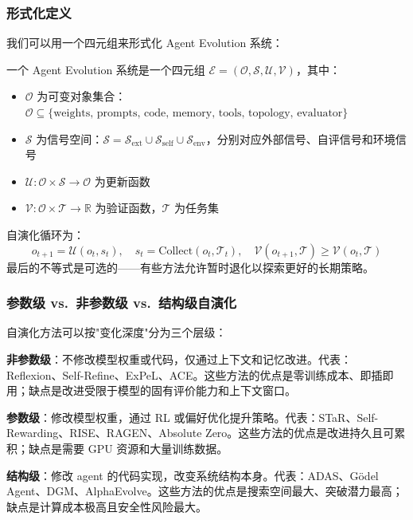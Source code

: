 \subsubsection{形式化定义}

我们可以用一个四元组来形式化 Agent Evolution 系统：

\begin{definition}
一个 Agent Evolution 系统是一个四元组 $\mathcal{E} = (\mathcal{O}, \mathcal{S}, \mathcal{U}, \mathcal{V})$，其中：
\begin{itemize}
\item $\mathcal{O}$ 为可变对象集合：$\mathcal{O} \subseteq \{\text{weights, prompts, code, memory, tools, topology, evaluator}\}$
\item $\mathcal{S}$ 为信号空间：$\mathcal{S} = \mathcal{S}_{\mathrm{ext}} \cup \mathcal{S}_{\mathrm{self}} \cup \mathcal{S}_{\mathrm{env}}$，分别对应外部信号、自评信号和环境信号
\item $\mathcal{U}: \mathcal{O} \times \mathcal{S} \rightarrow \mathcal{O}$ 为更新函数
\item $\mathcal{V}: \mathcal{O} \times \mathcal{T} \rightarrow \mathbb{R}$ 为验证函数，$\mathcal{T}$ 为任务集
\end{itemize}
自演化循环为：
\begin{equation}
o_{t+1} = \mathcal{U}(o_t, s_t), \quad s_t = \mathrm{Collect}(o_t, \mathcal{T}_t), \quad \mathcal{V}(o_{t+1}, \mathcal{T}) \geq \mathcal{V}(o_t, \mathcal{T})
\label{eq:evolution-loop}
\end{equation}
最后的不等式是可选的——有些方法允许暂时退化以探索更好的长期策略。
\end{definition}

\subsubsection{参数级 vs.\ 非参数级 vs.\ 结构级自演化}

自演化方法可以按"变化深度"分为三个层级：

\textbf{非参数级}：不修改模型权重或代码，仅通过上下文和记忆改进。代表：Reflexion、Self-Refine、ExPeL、ACE。这些方法的优点是零训练成本、即插即用；缺点是改进受限于模型的固有评价能力和上下文窗口。

\textbf{参数级}：修改模型权重，通过 RL 或偏好优化提升策略。代表：STaR、Self-Rewarding、RISE、RAGEN、Absolute Zero。这些方法的优点是改进持久且可累积；缺点是需要 GPU 资源和大量训练数据。

\textbf{结构级}：修改 agent 的代码实现，改变系统结构本身。代表：ADAS、Gödel Agent、DGM、AlphaEvolve。这些方法的优点是搜索空间最大、突破潜力最高；缺点是计算成本极高且安全性风险最大。

